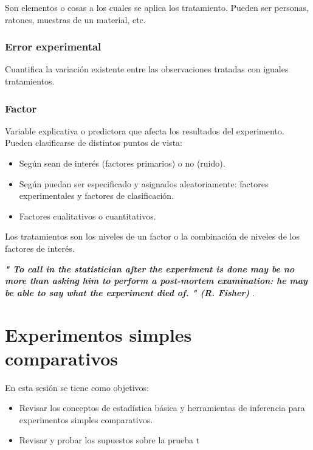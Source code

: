 \documentclass[]{book}
\providecommand{\tightlist}{%
  \setlength{\itemsep}{0pt}\setlength{\parskip}{0pt}}
\begin{document}
Son elementos o cosas a los cuales se aplica los tratamiento. Pueden ser
personas, ratones, muestras de un material, etc.

\subsection{Error experimental}\label{error-experimental}

Cuantifica la variación existente entre las observaciones tratadas con
iguales tratamientos.

\subsection{Factor}\label{factor}

Variable explicativa o predictora que afecta los resultados del
experimento. Pueden clasificarse de distintos puntos de vista:

\begin{itemize}
\tightlist
\item
  Según sean de interés (factores primarios) o no (ruido).
\item
  Según puedan ser especificado y asignados aleatoriamente: factores
  experimentales y factores de clasificación.
\item
  Factores cualitativos o cuantitativos.
\end{itemize}

Los tratamientos son los niveles de un factor o la combinación de
niveles de los factores de interés.

\textbf{\emph{" To call in the statistician after the experiment is done
may be no more than asking him to perform a post-mortem examination: he
may be able to say what the experiment died of. " (R. Fisher) }}.

\chapter{Experimentos simples
comparativos}\label{experimentos-simples-comparativos}

En esta sesión se tiene como objetivos:

\begin{itemize}
\item
  Revisar los conceptos de estadística básica y herramientas de
  inferencia para experimentos simples comparativos.
\item
  Revisar y probar los supuestos sobre la prueba t
\end{itemize}
\end{document}
